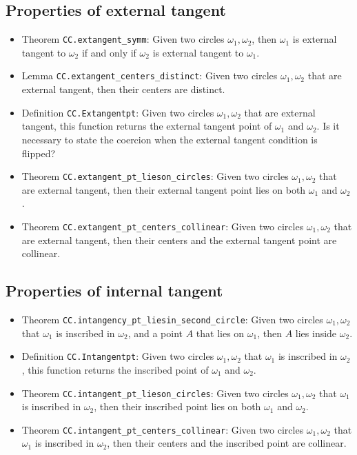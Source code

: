 \documentclass[12pt]{amsart}
\begin{document}
\subsection{Properties of external tangent}
\begin{itemize}
    \item Theorem \verb|CC.extangent_symm|: Given two circles $\omega_1,\omega_2$, then $\omega_1$ is external tangent to $\omega_2$ if and only if $\omega_2$ is external tangent to $\omega_1$.
    \item Lemma \verb|CC.extangent_centers_distinct|: Given two circles $\omega_1,\omega_2$ that are external tangent, then their centers are distinct.
    \item Definition \verb|CC.Extangentpt|: Given two circles $\omega_1,\omega_2$ that are external tangent, this function returns the external tangent point of $\omega_1$ and $\omega_2$. {\color{red} Is it necessary to state the coercion when the external tangent condition is flipped?}
    \item Theorem \verb|CC.extangent_pt_lieson_circles|: Given two circles $\omega_1,\omega_2$ that are external tangent, then their external tangent point lies on both $\omega_1$ and $\omega_2$.
    \item Theorem \verb|CC.extangent_pt_centers_collinear|: Given two circles $\omega_1,\omega_2$ that are external tangent, then their centers and the external tangent point are collinear.
\end{itemize}

\subsection{Properties of internal tangent}
\begin{itemize}
    \item Theorem \verb|CC.intangency_pt_liesin_second_circle|: Given two circles $\omega_1,\omega_2$ that $\omega_1$ is inscribed in $\omega_2$, and a point $A$ that lies on $\omega_1$, then $A$ lies inside $\omega_2$.
    \item Definition \verb|CC.Intangentpt|: Given two circles $\omega_1,\omega_2$ that $\omega_1$ is inscribed in $\omega_2$, this function returns the inscribed point of $\omega_1$ and $\omega_2$.
    \item Theorem \verb|CC.intangent_pt_lieson_circles|: Given two circles $\omega_1,\omega_2$ that $\omega_1$ is inscribed in $\omega_2$, then their inscribed point lies on both $\omega_1$ and $\omega_2$.
    \item Theorem \verb|CC.intangent_pt_centers_collinear|: Given two circles $\omega_1,\omega_2$ that $\omega_1$ is inscribed in $\omega_2$, then their centers and the inscribed point are collinear.
\end{itemize}
\end{document}
